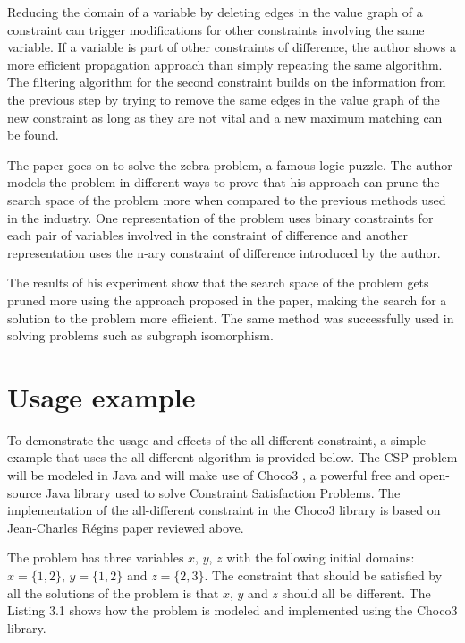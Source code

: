 \documentclass{l4proj}
\begin{document}
\noindent Reducing the domain of a variable by deleting edges in the value graph of a constraint can trigger modifications for other constraints involving the same variable. If a variable is part of other constraints of difference, the author shows a more efficient propagation approach than simply repeating the same algorithm. The filtering algorithm for the second constraint builds on the information from the previous step by trying to remove the same edges in the value graph of the new constraint as long as they are not vital and a new maximum matching can be found.

\noindent The paper goes on to solve the zebra problem, a famous logic puzzle. The author models the problem in different ways to prove that his approach can prune the search space of the problem more when compared to the previous methods used in the industry. One representation of the problem uses binary constraints for each pair of variables involved in the constraint of difference and another representation uses the n-ary constraint of difference introduced by the author. 

\noindent The results of his experiment show that the search space of the problem gets pruned more using the approach proposed in the paper, making the search for a solution to the problem more efficient. The same method was successfully used in solving problems such as subgraph isomorphism.

\section{Usage example}
\noindent To demonstrate the usage and effects of the all-different constraint, a simple example that uses the all-different algorithm is provided below. The CSP problem will be modeled in Java and will make use of Choco3 \cite{choco}, a powerful free and open-source Java library used to solve Constraint Satisfaction Problems. The implementation of the all-different constraint in the Choco3 library is based on Jean-Charles R\'egin\textquotesingle s paper \cite{regin1994filtering} reviewed above.

\noindent The problem has three variables $x$, $y$, $z$ with the following initial domains: $x = \{1, 2\}$, $y = \{1, 2\}$ and $z = \{2, 3\}$. The constraint that should be satisfied by all the solutions of the problem is that $x$, $y$ and $z$ should all be different. The Listing 3.1 shows how the problem is modeled and implemented using the Choco3 library.

\vspace*{1cm}
\end{document}
